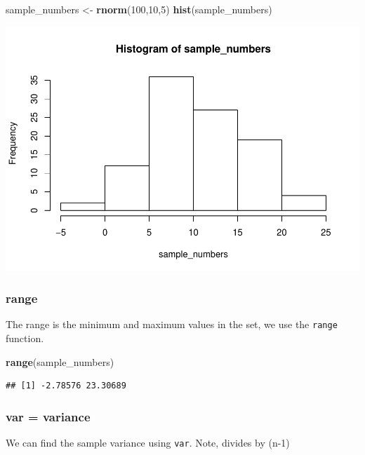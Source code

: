 \documentclass[]{book}
\newenvironment{Shaded}{\begin{snugshade}}{\end{snugshade}}
\newcommand{\KeywordTok}[1]{\textcolor[rgb]{0.13,0.29,0.53}{\textbf{#1}}}
\newcommand{\DecValTok}[1]{\textcolor[rgb]{0.00,0.00,0.81}{#1}}
\newcommand{\StringTok}[1]{\textcolor[rgb]{0.31,0.60,0.02}{#1}}
\newcommand{\NormalTok}[1]{#1}
\begin{document}
\begin{Shaded}
\begin{Highlighting}[]
\NormalTok{sample_numbers <-}\StringTok{ }\KeywordTok{rnorm}\NormalTok{(}\DecValTok{100}\NormalTok{,}\DecValTok{10}\NormalTok{,}\DecValTok{5}\NormalTok{)}
\KeywordTok{hist}\NormalTok{(sample_numbers)}
\end{Highlighting}
\end{Shaded}

\includegraphics{Statistics_Lab_files/figure-latex/unnamed-chunk-33-1.pdf}

\subsubsection{range}\label{range}

The range is the minimum and maximum values in the set, we use the
\texttt{range} function.

\begin{Shaded}
\begin{Highlighting}[]
\KeywordTok{range}\NormalTok{(sample_numbers)}
\end{Highlighting}
\end{Shaded}

\begin{verbatim}
## [1] -2.78576 23.30689
\end{verbatim}

\subsubsection{var = variance}\label{var-variance}

We can find the sample variance using \texttt{var}. Note, divides by
(n-1)
\end{document}
